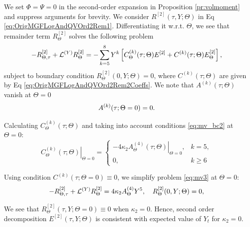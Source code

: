 \documentclass[pdftex,11pt,a4paper] {article}
\begin{document}
We set $\Phi=\Psi=0$ in the second-order expansion in Proposition \ref{pr:volmoment} and suppress arguments for brevity. We consider $R^{[2]}(\tau, Y;\Theta)$ in Eq \eqref{eq:OrigMGFLogAndQVOrd2Rem1}. 
Differentiating it w.r.t. $\Theta$, we see that remainder term  $R_{\Theta}^{[2]}$ solves the following problem
\begin{equation}\label{eq:mv3}
\begin{split}
-R_{\Theta,\tau}^{[2]}+\mathcal{L}^{(Y)}R_{\Theta}^{[2]}=
-\sum_{k=5}^8Y^k\left[C_{\Theta}^{(k)}(\tau;\Theta)E^{[2]}+C^{(k)}(\tau;\Theta)E_{\Theta}^{[2]}\right],\vspace*{-1.0\baselineskip}
\end{split}
\end{equation}
subject to boundary condition $R_{\Theta}^{[2]}(0,Y;\Theta)=0$, where $C^{(k)}(\tau;\Theta)$ are given by Eq \eqref{eq:OrigMGFLogAndQVOrd2Rem2Coeffs}. We note that $A^{(k)}(\tau; \Theta)$ vanish at $\Theta=0$\vspace*{-0.5\baselineskip}
\begin{equation}\label{eq:mv_bc2}
A^{(k)}(\tau; \Theta=0)=0.\vspace*{-0.5\baselineskip}
\end{equation}

Calculating $C^{(k)}_{\Theta}(\tau; \Theta)$ and taking into account conditions \eqref{eq:mv_bc2} at $\Theta=0$:
\begin{equation}\label{eq:mv31}
\left.C^{(k)}_{\Theta}(\tau; \Theta)\right|_{\Theta=0}=
\begin{cases}
-4\kappa_2 \left. A^{(4)}_{\Theta}(\tau; \Theta)\right|_{\Theta=0}, & k=5,\\
0, & k\ge 6
\end{cases}
\end{equation}


Using condition $C^{(k)}(\tau; \Theta=0)\equiv 0$, we simplify problem \eqref{eq:mv3} at $\Theta=0$:
\begin{equation}\label{eq:mv4}
-R_{\Theta,\tau}^{[2]}+\mathcal{L}^{(Y)}R_{\Theta}^{[2]}=4\kappa_2 A_{\Theta}^{(4)}Y^5,\quad 
R_{\Theta}^{[2]}(0,Y;\Theta)=0,\vspace*{-0.5\baselineskip}
\end{equation}

We see that $R_{\Theta}^{[2]}(\tau,Y;\Theta=0)\equiv 0$ when $\kappa_2=0$. Hence, second order decomposition $E^{[2]}(\tau,Y; \Theta)$ is consistent with expected value of $Y_t$ for $\kappa_2=0$. 
\end{document}
